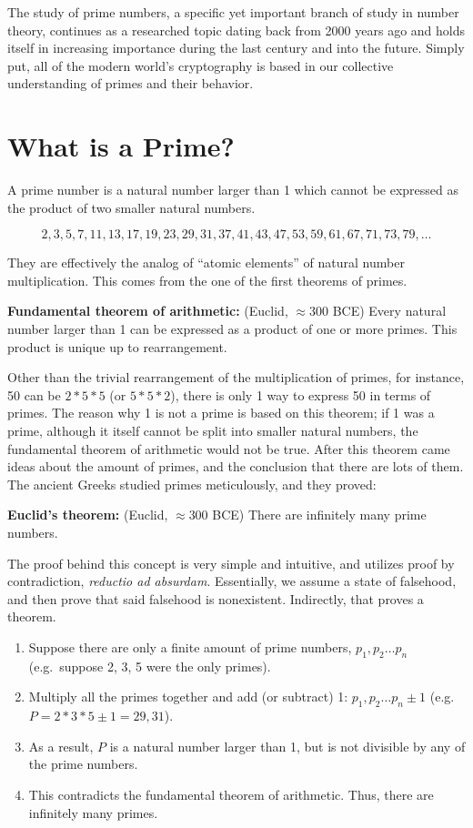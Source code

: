 
The study of prime numbers, a specific yet important branch of study in number theory, continues as a researched topic dating back from 2000 years ago and holds itself in increasing importance during the last century and into the future. Simply put, all of the modern world’s cryptography is based in our collective understanding of primes and their behavior. 

\section*{What is a Prime?}

A prime number is a natural number larger than 1 which cannot be expressed as the product of two smaller natural numbers. 

\[2, 3, 5, 7, 11, 13, 17, 19, 23, 29, 31, 37, 41, 43, 47, 53, 59 ,61, 67, 71, 73, 79, \ldots \]

They are effectively the analog of “atomic elements” of natural number multiplication. This comes from the one of the first theorems of primes.

\textbf{Fundamental theorem of arithmetic:}  (Euclid, \(\approx 300\) BCE) Every natural number larger than 1 can be expressed as a product of one or more primes. This product is unique up to rearrangement.

Other than the trivial rearrangement of the multiplication of primes, for instance, 50 can be \(2 * 5 * 5\) (or \(5 * 5 * 2\)), there is only 1 way to express 50 in terms of primes. The reason why 1 is not a prime is based on this theorem; if 1 was a prime, although it itself cannot be split into smaller natural numbers, the fundamental theorem of arithmetic would not be true. After this theorem came ideas about the amount of primes, and the conclusion that there are lots of them. The ancient Greeks studied primes meticulously, and they proved:

\textbf{Euclid’s theorem:} (Euclid, \(\approx 300\) BCE) There are infinitely many prime numbers.

The proof behind this concept is very simple and intuitive, and utilizes proof by contradiction, \textit{reductio ad absurdam}. Essentially, we assume a state of falsehood, and then prove that said falsehood is nonexistent. Indirectly, that proves a theorem. 

\begin{enumerate}
    \item Suppose there are only a finite amount of prime numbers, \(p_1, p_2 \ldots p_n\) (e.g.\ suppose 2, 3, 5 were the only primes).
    \item Multiply all the primes together and add (or subtract) 1: \(p_1, p_2 \ldots p_n \pm 1\) (e.g. \(P = 2 * 3 * 5 \pm 1 = 29, 31\)).
    \item As a result, \(P\) is a natural number larger than 1, but is not divisible by any of the prime numbers.
    \item This contradicts the fundamental theorem of arithmetic. Thus, there are infinitely many primes.
\end{enumerate}


